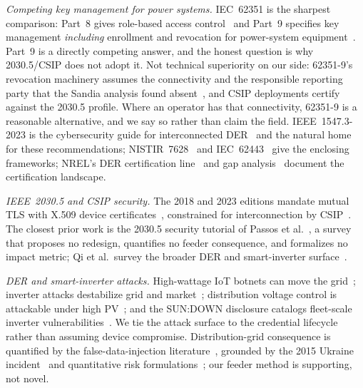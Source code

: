 \emph{Competing key management for power systems.} IEC~62351 is the sharpest comparison: Part~8
gives role-based access control~\cite{iec62351-8} and Part~9 specifies key management
\emph{including} enrollment and revocation for power-system equipment~\cite{iec62351-9}. Part~9 is
a directly competing answer, and the honest question is why 2030.5/CSIP does not adopt it. Not
technical superiority on our side: 62351-9's revocation machinery assumes the connectivity and the
responsible reporting party that the Sandia analysis found
absent~\cite{obert2019recommendations}, and CSIP deployments certify against the 2030.5 profile.
Where an operator has that connectivity, 62351-9 is a reasonable alternative, and we say so rather
than claim the field. IEEE~1547.3-2023 is the cybersecurity guide for interconnected
DER~\cite{ieee1547.3-2023} and the natural home for these recommendations;
NISTIR~7628~\cite{nistir7628r1} and IEC~62443~\cite{iec62443-3-3,iec62443-4-2} give the enclosing
frameworks; NREL's DER certification line~\cite{nrel80581,saleem2022dercert} and gap
analysis~\cite{magill2026dergap} document the certification landscape.

\emph{IEEE~2030.5 and CSIP security.} The 2018 and 2023 editions mandate mutual TLS with X.509
device certificates~\cite{ieee20305-2018,ieee20305-2023}, constrained for interconnection by
CSIP~\cite{sunspec2018csip}. The closest prior work is the 2030.5 security tutorial of Passos et
al.~\cite{passos2025tutorial}, a survey that proposes no redesign, quantifies no feeder
consequence, and formalizes no impact metric; Qi et al.\ survey the broader DER and smart-inverter
surface~\cite{qi2016cybersecurity}.

\emph{DER and smart-inverter attacks.} High-wattage IoT botnets can move the
grid~\cite{soltan2018blackiot,shekari2022madiot}; inverter attacks destabilize grid and
market~\cite{hui2025destabilizing}; distribution voltage control is attackable under high
PV~\cite{isozaki2016detection}; and the SUN:DOWN disclosure catalogs fleet-scale inverter
vulnerabilities~\cite{forescout2025sundown}. We tie the attack surface to the credential lifecycle
rather than assuming device compromise. Distribution-grid consequence is quantified by the
false-data-injection literature~\cite{liu2009false,deng2017false,liang2017review}, grounded by the
2015 Ukraine incident~\cite{liang2017ukraine} and quantitative risk
formulations~\cite{teixeira2015secure}; our feeder method is supporting, not novel.

